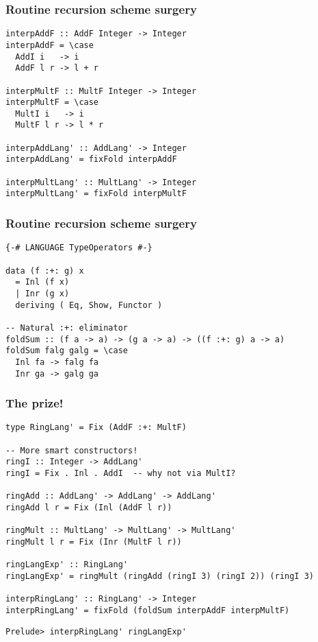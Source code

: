 \documentclass[pdf]{beamer}
\begin{document}
\begin{frame}[fragile]
  \frametitle{Routine recursion scheme surgery}
\begin{lstlisting}
interpAddF :: AddF Integer -> Integer
interpAddF = \case
  AddI i   -> i
  AddF l r -> l + r

interpMultF :: MultF Integer -> Integer
interpMultF = \case
  MultI i   -> i
  MultF l r -> l * r

interpAddLang' :: AddLang' -> Integer
interpAddLang' = fixFold interpAddF

interpMultLang' :: MultLang' -> Integer
interpMultLang' = fixFold interpMultF
\end{lstlisting}
\end{frame}

\begin{frame}[fragile]
  \frametitle{Routine recursion scheme surgery}
\begin{lstlisting}
{-# LANGUAGE TypeOperators #-}

data (f :+: g) x 
  = Inl (f x) 
  | Inr (g x) 
  deriving ( Eq, Show, Functor )

-- Natural :+: eliminator
foldSum :: (f a -> a) -> (g a -> a) -> ((f :+: g) a -> a)
foldSum falg galg = \case
  Inl fa -> falg fa
  Inr ga -> galg ga
\end{lstlisting}
\end{frame}

\begin{frame}[fragile]
  \frametitle{The prize!}
\begin{lstlisting}
type RingLang' = Fix (AddF :+: MultF)

-- More smart constructors!
ringI :: Integer -> AddLang'
ringI = Fix . Inl . AddI  -- why not via MultI?

ringAdd :: AddLang' -> AddLang' -> AddLang'
ringAdd l r = Fix (Inl (AddF l r))

ringMult :: MultLang' -> MultLang' -> MultLang'
ringMult l r = Fix (Inr (MultF l r))

ringLangExp' :: RingLang'
ringLangExp' = ringMult (ringAdd (ringI 3) (ringI 2)) (ringI 3)

interpRingLang' :: RingLang' -> Integer
interpRingLang' = fixFold (foldSum interpAddF interpMultF)
\end{lstlisting}
\end{frame}

\begin{frame}[fragile]
\begin{lstlisting}
Prelude> interpRingLang' ringLangExp'

\end{lstlisting}
\end{frame}
\end{document}
